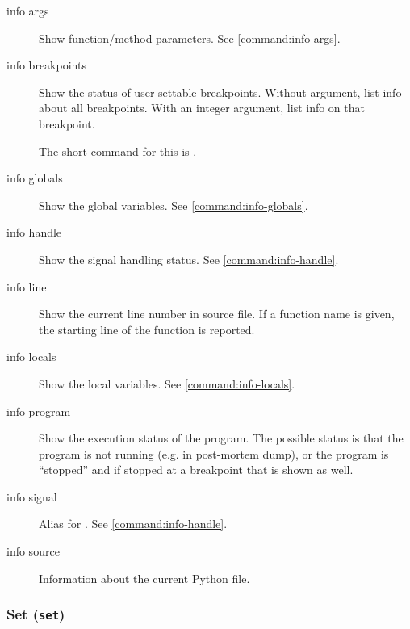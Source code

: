 \begin{description}

\item[info args]

Show function/method parameters. See \ref{command:info-args}.

\item[info breakpoints]

Show the status of user-settable breakpoints.  Without argument, list
info about all breakpoints.  With an integer argument, list info on
that breakpoint.

The short command for this is .

\item[info globals]

Show the global variables. See \ref{command:info-globals}. 

\item[info handle]

Show the signal handling status. See \ref{command:info-handle}. 

\item[info line]

Show the current line number in source file. If a function name is
given, the starting line of the function is reported.

\item[info locals]

Show the local variables. See \ref{command:info-locals}. 

\item[info program]

Show the execution status of the program. The possible status is that
the program is not running (e.g. in post-mortem dump), or the program is
``stopped'' and if stopped at a breakpoint that is shown as well.

\item[info signal]

Alias for . See \ref{command:info-handle}. 

\item[info source]

Information about the current Python file.

\end{description}

\subsubsection{Set ({\tt set})\label{subsubsection-set}}

